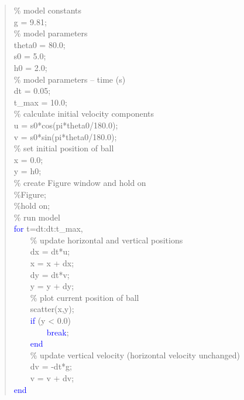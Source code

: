 \documentclass{tufte-book} %
\newenvironment{docspecmargin}{\begin{quotation}\ttfamily\footnotesize\parskip0pt\parindent0pt\ignorespaces}{\end{quotation}}
\begin{document}
\begin{docspecmargin}
\% model constants
\\g = 9.81;
\\\textcolor[rgb]{0,0.501961,0}{\% model parameters}
\\theta0 = 80.0;
\\s0 = 5.0;
\\h0 = 2.0;
\\\textcolor[rgb]{0,0.501961,0}{\% model parameters -- time (s)}
\\dt = 0.05;
\\t\_max = 10.0;
\\\textcolor[rgb]{0,0.501961,0}{\% calculate initial velocity components}
\\u = s0*cos(pi*theta0/180.0);
\\v = s0*sin(pi*theta0/180.0);
\\\textcolor[rgb]{0,0.501961,0}{\% set initial position of ball}
\\x = 0.0;
\\y = h0;
\textcolor[rgb]{0,0.501961,0}{\\\% create Figure window and hold on
\\\%Figure;
\\\%hold on;}
\\\textcolor[rgb]{0,0.501961,0}{\% run model}
\\\textcolor{blue}{for} t=dt:dt:t\_max,
\\ \ \ \ \    \textcolor[rgb]{0,0.501961,0}{\% update horizontal and vertical positions}
\\ \ \ \ \    dx = dt*u;
\\ \ \ \ \    x = x + dx;
\\ \ \ \ \    dy = dt*v;
\\ \ \ \ \    y = y + dy;
\\ \ \ \ \    \textcolor[rgb]{0,0.501961,0}{\% plot current position of ball}
\\ \ \ \ \    scatter(x,y);
\\ \ \ \ \    \textcolor{blue}{if} (y < 0.0)
\\ \ \ \ \ \ \ \ \        \textcolor{blue}{break};
\\ \ \ \ \    \textcolor{blue}{end}
\\ \ \ \ \    \textcolor[rgb]{0,0.501961,0}{\% update vertical velocity (horizontal velocity unchanged)}
\\ \ \ \ \   dv = -dt*g;
\\ \ \ \ \   v = v + dv;
\\\textcolor{blue}{end}
\end{docspecmargin}
\end{document}
